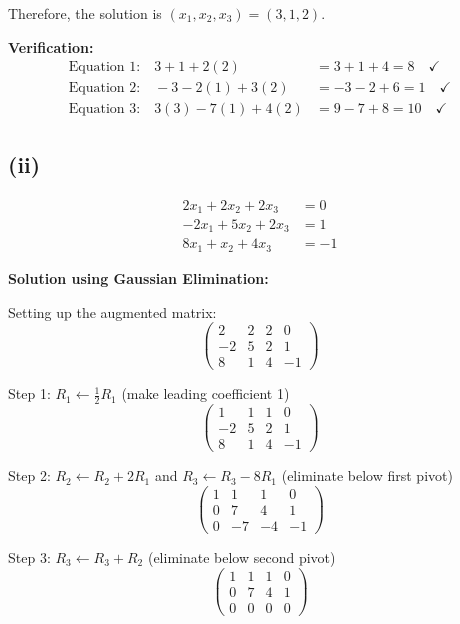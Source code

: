 \documentclass[12pt]{article}
\begin{document}
Therefore, the solution is $\boxed{(x_1, x_2, x_3) = (3, 1, 2)}$.

\textbf{Verification:}
\begin{align*}
\text{Equation 1:} \quad 3 + 1 + 2(2) &= 3 + 1 + 4 = 8 \quad \checkmark\\
\text{Equation 2:} \quad -3 - 2(1) + 3(2) &= -3 - 2 + 6 = 1 \quad \checkmark\\
\text{Equation 3:} \quad 3(3) - 7(1) + 4(2) &= 9 - 7 + 8 = 10 \quad \checkmark
\end{align*}

\subsection*{(ii)}
\begin{align*}
2x_1 + 2x_2 + 2x_3 &= 0\\
-2x_1 + 5x_2 + 2x_3 &= 1\\
8x_1 + x_2 + 4x_3 &= -1
\end{align*}

\textbf{Solution using Gaussian Elimination:}

Setting up the augmented matrix:
\[
\left(\begin{array}{ccc|c}
2 & 2 & 2 & 0\\
-2 & 5 & 2 & 1\\
8 & 1 & 4 & -1
\end{array}\right)
\]

Step 1: $R_1 \leftarrow \frac{1}{2}R_1$ (make leading coefficient 1)
\[
\left(\begin{array}{ccc|c}
1 & 1 & 1 & 0\\
-2 & 5 & 2 & 1\\
8 & 1 & 4 & -1
\end{array}\right)
\]

Step 2: $R_2 \leftarrow R_2 + 2R_1$ and $R_3 \leftarrow R_3 - 8R_1$ (eliminate below first pivot)
\[
\left(\begin{array}{ccc|c}
1 & 1 & 1 & 0\\
0 & 7 & 4 & 1\\
0 & -7 & -4 & -1
\end{array}\right)
\]

Step 3: $R_3 \leftarrow R_3 + R_2$ (eliminate below second pivot)
\[
\left(\begin{array}{ccc|c}
1 & 1 & 1 & 0\\
0 & 7 & 4 & 1\\
0 & 0 & 0 & 0
\end{array}\right)
\]
\end{document}
